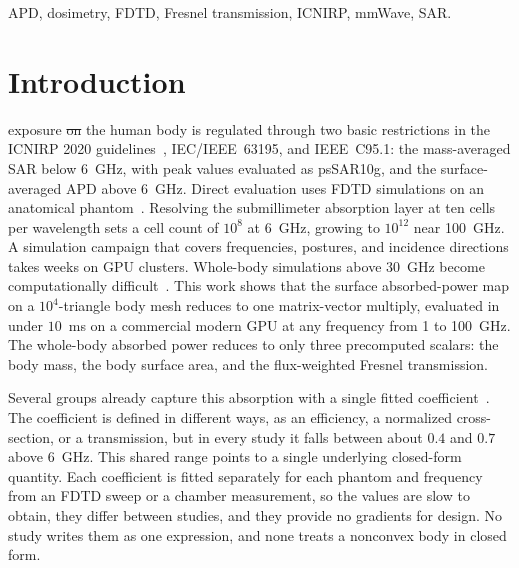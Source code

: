 \documentclass[journal,twocolumn,10pt]{IEEEtran}
\providecommand{\DIFaddtex}[1]{{\protect\color{blue}\uwave{#1}}} %
\providecommand{\DIFdeltex}[1]{{\protect\color{red}\sout{#1}}}                      %
\providecommand{\DIFaddbegin}{} %
\providecommand{\DIFaddend}{} %
\providecommand{\DIFdelbegin}{} %
\providecommand{\DIFdelend}{} %
\providecommand{\DIFadd}[1]{\texorpdfstring{\DIFaddtex{#1}}{#1}} %
\providecommand{\DIFdel}[1]{\texorpdfstring{\DIFdeltex{#1}}{}} %
\newcommand{\DIFscaledelfig}{0.5}
\newlength{\DIFdelgraphicswidth} %
\newlength{\DIFdelgraphicsheight} %
\newcommand{\DIFaddincludegraphics}[2][]{{\color{blue}\fbox{\DIFOincludegraphics[#1]{#2}}}} %
\newcommand{\DIFdelincludegraphics}[2][]{%
\sbox{\DIFdelgraphicsbox}{\DIFOincludegraphics[#1]{#2}}%
\settoboxwidth{\DIFdelgraphicswidth}{\DIFdelgraphicsbox} %
\settoboxtotalheight{\DIFdelgraphicsheight}{\DIFdelgraphicsbox} %
\scalebox{\DIFscaledelfig}{%
\parbox[b]{\DIFdelgraphicswidth}{\usebox{\DIFdelgraphicsbox}\\[-\baselineskip] \rule{\DIFdelgraphicswidth}{0em}}\llap{\resizebox{\DIFdelgraphicswidth}{\DIFdelgraphicsheight}{%
\setlength{\unitlength}{\DIFdelgraphicswidth}%
\begin{picture}(1,1)%
\thicklines\linethickness{2pt} %
{\color[rgb]{1,0,0}\put(0,0){\framebox(1,1){}}}%
{\color[rgb]{1,0,0}\put(0,0){\line( 1,1){1}}}%
{\color[rgb]{1,0,0}\put(0,1){\line(1,-1){1}}}%
\end{picture}%
}\hspace*{3pt}}} %
} %
\DeclareRobustCommand{\DIFaddbegin}{\DIFOaddbegin \let\includegraphics\DIFaddincludegraphics} %
\DeclareRobustCommand{\DIFaddend}{\DIFOaddend \let\includegraphics\DIFOincludegraphics} %
\DeclareRobustCommand{\DIFdelbegin}{\DIFOdelbegin \let\includegraphics\DIFdelincludegraphics} %
\DeclareRobustCommand{\DIFdelend}{\DIFOaddend \let\includegraphics\DIFOincludegraphics} %
\begin{document}
\begin{IEEEkeywords}
APD, dosimetry, FDTD, Fresnel transmission, ICNIRP, mmWave, SAR.
\end{IEEEkeywords}

\IEEEpeerreviewmaketitle

\section{Introduction}\label{sec:introduction}

 exposure \DIFdelbegin \DIFdel{on }\DIFdelend \DIFaddbegin \DIFadd{of }\DIFaddend the human body is regulated
through two basic restrictions in the \gls{ICNIRP} 2020
guidelines~\cite{ICNIRP2020}, IEC/IEEE~63195, and IEEE~C95.1: the
mass-averaged \gls{SAR} below 6~GHz, with peak values evaluated as
\gls{psSAR10g}, and the surface-averaged \gls{APD} above 6~GHz. Direct evaluation uses
\gls{FDTD} simulations on an anatomical
phantom~\cite{Kodera2024,Diao2024,Hirata2021,Wydaeghe2026}. Resolving the submillimeter
absorption layer at ten cells per wavelength
sets a cell count of $10^{8}$ at 6~GHz, growing to $10^{12}$ near
100~GHz. A simulation campaign that covers frequencies, postures, and
incidence directions takes weeks on \gls{GPU} clusters. Whole-body
simulations above 30~GHz become computationally difficult~\cite{Wydaeghe2026}.
This work shows that the surface absorbed-power map on a
$10^4$-triangle body mesh reduces to one matrix-vector multiply,
evaluated in under $10$~ms on a commercial modern GPU at any
frequency from 1 to 100~GHz. The whole-body absorbed power
reduces to only three precomputed scalars: the body mass, the
body surface area, and the flux-weighted Fresnel transmission.

Several groups already capture this absorption with a single fitted
coefficient~\cite{Bamba2014,Flintoft2014,Zhang2017thesis,ZhangRobinson2020,Kodera2024,Diao2024}.
The coefficient is defined in different ways, as an efficiency, a
normalized cross-section, or a transmission, but in every study it
falls between about $0.4$ and $0.7$ above $6$~GHz. This shared range
points to a single underlying closed-form quantity. Each coefficient
is fitted separately for each phantom and frequency from an \gls{FDTD}
sweep or a chamber measurement, so the values are slow to obtain, they
differ between studies, and they provide no gradients for design. No
study writes them as one expression, and none treats a nonconvex body
in closed form.
\end{document}
